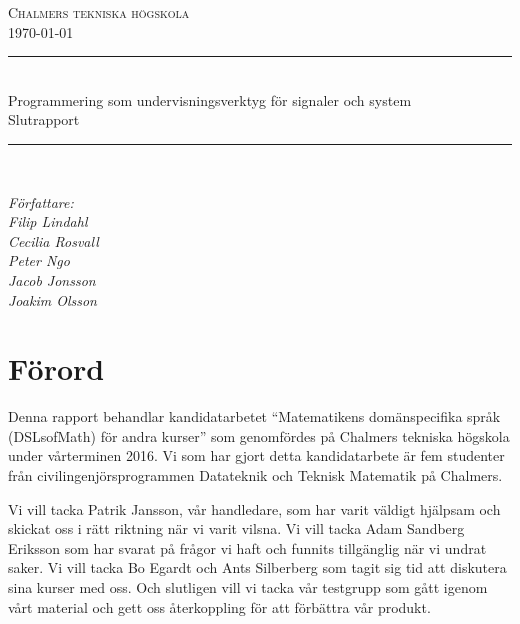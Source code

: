 \documentclass[]{article}
\date{\today}
\begin{document}
\begin{titlepage} \newcommand{\HRule}{\rule{\linewidth}{0.3mm}}
  \center
  \textsc{\Large Chalmers tekniska högskola}\\[0.05cm]
  \normalsize \today

  \HRule \\[0.08cm]
  { \large Programmering som undervisningsverktyg för signaler och system
    \\
    \normalsize{Slutrapport}
  } \\[0.08cm] %
  \HRule \\[0.3cm]

  \vfill

  \begin{flushleft}
    \small
    \emph{Författare:\\
      \quad Filip Lindahl\\
      \quad Cecilia Rosvall\\
      \quad Peter Ngo\\
      \quad Jacob Jonsson\\
      \quad Joakim Olsson\\}
  \end{flushleft}
\end{titlepage}
\newpage

\setlength{\parskip}{2mm}
\setlength{\parindent}{0pt}

\section*{Förord}
Denna rapport behandlar kandidatarbetet ``Matematikens domänspecifika språk
(DSLsofMath) för andra kurser'' som genomfördes på Chalmers tekniska högskola
 under vårterminen 2016. Vi som har gjort detta kandidatarbete är fem studenter
från civilingenjörsprogrammen Datateknik och Teknisk Matematik på Chalmers.

Vi vill tacka Patrik Jansson, vår handledare, som har varit väldigt hjälpsam
och skickat oss i rätt riktning när vi varit vilsna. Vi vill tacka Adam Sandberg Eriksson
som har svarat på frågor vi haft och funnits tillgänglig när vi undrat saker. Vi
vill tacka Bo Egardt och Ants Silberberg som tagit sig tid att diskutera sina
kurser med oss. Och slutligen vill vi tacka vår testgrupp som gått igenom vårt
material och gett oss återkoppling för att förbättra vår produkt.

\newpage
\end{document}

